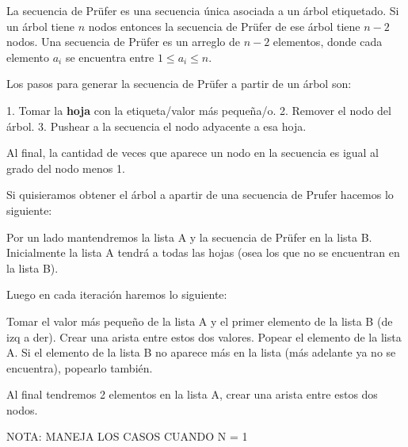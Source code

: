 {\normalsize
    La secuencia de Prüfer es una secuencia única asociada a un árbol etiquetado. Si un árbol tiene $n$ nodos entonces la secuencia de Prüfer de ese árbol tiene $n-2$ nodos.
    Una secuencia de Prüfer es un arreglo de $n-2$ elementos, donde cada elemento $a_i$ se encuentra entre $1 \leq a_i \leq n$.

    Los pasos para generar la secuencia de Prüfer a partir de un árbol son:

    1. Tomar la \textbf{hoja} con la etiqueta/valor más pequeña/o.
    2. Remover el nodo del árbol.
    3. Pushear a la secuencia el nodo adyacente a esa hoja.

    Al final, la cantidad de veces que aparece un nodo en la secuencia es igual al grado del nodo menos 1.

    Si quisieramos obtener el árbol a apartir de una secuencia de Prufer hacemos lo siguiente:

    Por un lado mantendremos la lista A y la secuencia de Prüfer en la lista B.
    Inicialmente la lista A tendrá a todas las hojas (osea los que no se encuentran en la lista B).

    Luego en cada iteración haremos lo siguiente:

    Tomar el valor más pequeño de la lista A y el primer elemento de la lista B (de izq a der).
    Crear una arista entre estos dos valores.
    Popear el elemento de la lista A.
    Si el elemento de la lista B no aparece más en la lista (más adelante ya no se encuentra), popearlo también.


    Al final tendremos 2 elementos en la lista A, crear una arista entre estos dos nodos.

    NOTA: MANEJA LOS CASOS CUANDO N = 1
}